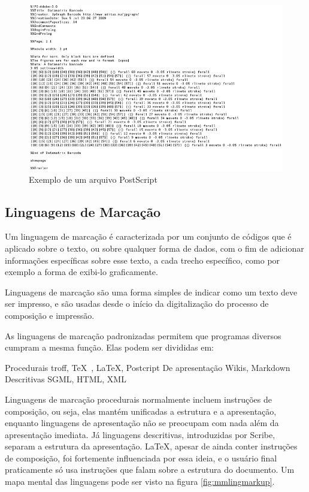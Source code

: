 \begin{figure}[hbt]
    \centering
    \includegraphics[width=0.7\linewidth]{Images/ps}
    \caption[Exemplo de um arquivo PostScript]{Exemplo de um arquivo PostScript}
    \label{fig:psfile}
\end{figure}


\subsection{Linguagens de Marcação}

Um linguagem de marcação é caracterizada por um conjunto de códigos que é aplicado sobre o texto, ou sobre qualquer forma de dados, com o fim de adicionar informações específicas sobre esse texto, a cada trecho específico, como por exemplo a forma de exibi-lo graficamente.

Linguagens de marcação são uma forma simples de indicar como um texto deve ser impresso, e são usadas desde o início da digitalização do processo de composição e impressão.

As linguagens de marcação padronizadas permitem que programas diversos cumpram a mesma função. Elas podem ser divididas em:
\begin{outline} 
    \1 Procedurais
    \2 troff, \TeX\ , \LaTeX , Postcript
    \1 De apresentação
    \2 Wikis, Markdown
    \1 Descritivas
    \2 SGML, HTML, XML
\end{outline}

Linguagens de marcação procedurais normalmente incluem instruções de composição, ou seja, elas mantém unificadas a estrutura e a apresentação, enquanto linguagens de apresentação não se preocupam com nada além da apresentação imediata. Já linguagens descritivas, introduzidas por Scribe, separam a estrutura da apresentação. \LaTeX, apesar de ainda conter instruções de composição, foi fortemente influenciada por essa ideia, e o usuário final praticamente só usa instruções que falam sobre a estrutura do documento. Um mapa mental das linguagens pode ser visto na figura \ref{fig:mmlingmarkup}\parencite{Adams:2007}.


